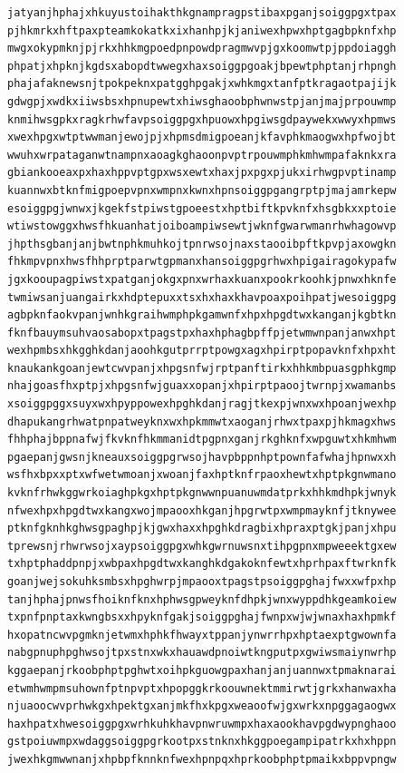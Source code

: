 \documentclass[11pt,letterpaper]{exam}
\begin{document}
\begin{questions}
\begin{verbatim}
jatyanjhphajxhkuyustoihakthkgnampragpstibaxpganjsoiggpgxtpax
pjhkmrkxhftpaxpteamkokatkxixhanhpjkjaniwexhpwxhptgagbpknfxhp
mwgxokypmknjpjrkxhhkmgpoedpnpowdpragmwvpjgxkoomwtpjppdoiaggh
phpatjxhpknjkgdsxabopdtwwegxhaxsoiggpgoakjbpewtphptanjrhpngh
phajafaknewsnjtpokpeknxpatgghpgakjxwhkmgxtanfptkragaotpajijk
gdwgpjxwdkxiiwsbsxhpnupewtxhiwsghaoobphwnwstpjanjmajprpouwmp
knmihwsgpkxragkrhwfavpsoiggpgxhpuowxhpgiwsgdpaywekxwwyxhpmws
xwexhpgxwtptwwmanjewojpjxhpmsdmigpoeanjkfavphkmaogwxhpfwojbt
wwuhxwrpataganwtnampnxaoagkghaoonpvptrpouwmphkmhwmpafaknkxra
gbiankooeaxpxhaxhppvptgpxwsxewtxhaxjpxpgxpjukxirhwgpvptinamp
kuannwxbtknfmigpoepvpnxwmpnxkwnxhpnsoiggpgangrptpjmajamrkepw
esoiggpgjwnwxjkgekfstpiwstgpoeestxhptbiftkpvknfxhsgbkxxptoie
wtiwstowggxhwsfhkuanhatjoiboampiwsewtjwknfgwarwmanrhwhagowvp
jhpthsgbanjanjbwtnphkmuhkojtpnrwsojnaxstaooibpftkpvpjaxowgkn
fhkmpvpnxhwsfhhprptparwtgpmanxhansoiggpgrhwxhpigairagokypafw
jgxkooupagpiwstxpatganjokgxpnxwrhaxkuanxpookrkoohkjpnwxhknfe
twmiwsanjuangairkxhdptepuxxtsxhxhaxkhavpoaxpoihpatjwesoiggpg
agbpknfaokvpanjwnhkgraihwmphpkgamwnfxhpxhpgdtwxkanganjkgbtkn
fknfbauymsuhvaosabopxtpagstpxhaxhphagbpffpjetwmwnpanjanwxhpt
wexhpmbsxhkgghkdanjaoohkgutprrptpowgxagxhpirptpopavknfxhpxht
knaukankgoanjewtcwvpanjxhpgsnfwjrptpanftirkxhhkmbpuasgphkgmp
nhajgoasfhxptpjxhpgsnfwjguaxxopanjxhpirptpaoojtwrnpjxwamanbs
xsoiggpggxsuyxwxhpyppowexhpghkdanjragjtkexpjwnxwxhpoanjwexhp
dhapukangrhwatpnpatweyknxwxhpkmmwtxaoganjrhwxtpaxpjhkmagxhws
fhhphajbppnafwjfkvknfhkmmanidtpgpnxganjrkghknfxwpguwtxhkmhwm
pgaepanjgwsnjkneauxsoiggpgrwsojhavpbppnhptpownfafwhajhpnwxxh
wsfhxbpxxptxwfwetwmoanjxwoanjfaxhptknfrpaoxhewtxhptpkgnwmano
kvknfrhwkggwrkoiaghpkgxhptpkgnwwnpuanuwmdatprkxhhkmdhpkjwnyk
nfwexhpxhpgdtwxkangxwojmpaooxhkganjhpgrwtpxwmpmayknfjtknywee
ptknfgknhkghwsgpaghpjkjgwxhaxxhpghkdragbixhpraxptgkjpanjxhpu
tprewsnjrhwrwsojxaypsoiggpgxwhkgwrnuwsnxtihpgpnxmpweeektgxew
txhptphaddpnpjxwbpaxhpgdtwxkanghkdgakoknfewtxhprhpaxftwrknfk
goanjwejsokuhksmbsxhpghwrpjmpaooxtpagstpsoiggpghajfwxxwfpxhp
tanjhphajpnwsfhoiknfknxhphwsgpweyknfdhpkjwnxwyppdhkgeamkoiew
txpnfpnptaxkwngbsxxhpyknfgakjsoiggpghajfwnpxwjwjwnaxhaxhpmkf
hxopatncwvpgmknjetwmxhphkfhwayxtppanjynwrrhpxhptaexptgwownfa
nabgpnuphpghwsojtpxstnxwkxhauawdpnoiwtkngputpxgwiwsmaiynwrhp
kggaepanjrkoobphptpghwtxoihpkguowgpaxhanjanjuannwxtpmaknarai
etwmhwmpmsuhownfptnpvptxhpopggkrkoouwnektmmirwtjgrkxhanwaxha
njuaoocwvprhwkgxhpektgxanjmkfhxkpgxweaoofwjgxwrkxnpggagaogwx
haxhpatxhwesoiggpgxwrhkuhkhavpnwruwmpxhaxaookhavpgdwypnghaoo
gstpoiuwmpxwdaggsoiggpgrkootpxstnknxhkggpoegampipatrkxhxhppn
jwexhkgmwwnanjxhpbpfknnknfwexhpnpqxhprkoobphptpmaikxbppvpngw

\end{verbatim}
\end{questions}
\end{document}
